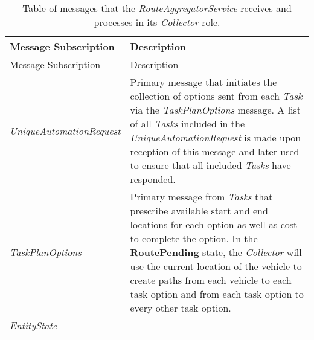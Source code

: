 \begin{longtable}[c]{@{}ll@{}}
\caption{Table of messages that the \emph{RouteAggregatorService}
receives and processes in its \emph{Collector} role.}\tabularnewline
\toprule
\begin{minipage}[b]{0.29\columnwidth}\raggedright\strut
Message Subscription
\strut\end{minipage} &
\begin{minipage}[b]{0.65\columnwidth}\raggedright\strut
Description
\strut\end{minipage}\tabularnewline
\midrule
\endfirsthead
\toprule
\begin{minipage}[b]{0.29\columnwidth}\raggedright\strut
Message Subscription
\strut\end{minipage} &
\begin{minipage}[b]{0.65\columnwidth}\raggedright\strut
Description
\strut\end{minipage}\tabularnewline
\midrule
\endhead
\begin{minipage}[t]{0.29\columnwidth}\raggedright\strut
\emph{UniqueAutomationRequest}
\strut\end{minipage} &
\begin{minipage}[t]{0.65\columnwidth}\raggedright\strut
Primary message that initiates the collection of options sent from each
\emph{Task} via the \emph{TaskPlanOptions} message. A list of all
\emph{Tasks} included in the \emph{UniqueAutomationRequest} is made upon
reception of this message and later used to ensure that all included
\emph{Tasks} have responded.
\strut\end{minipage}\tabularnewline
\begin{minipage}[t]{0.29\columnwidth}\raggedright\strut
\emph{TaskPlanOptions}
\strut\end{minipage} &
\begin{minipage}[t]{0.65\columnwidth}\raggedright\strut
Primary message from \emph{Tasks} that prescribe available start and end
locations for each option as well as cost to complete the option. In the
\textbf{RoutePending} state, the \emph{Collector} will use the current
location of the vehicle to create paths from each vehicle to each task
option and from each task option to every other task option.
\strut\end{minipage}\tabularnewline
\begin{minipage}[t]{0.29\columnwidth}\raggedright\strut
\emph{EntityState}
\strut\end{minipage} &
\begin{minipage}[t]{0.65\columnwidth}\raggedright\strut

\end{minipage}
\end{longtable}
